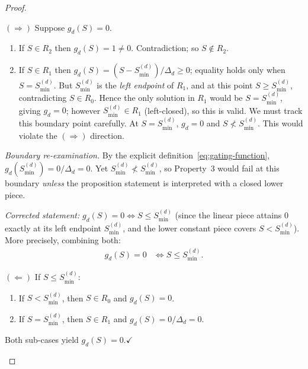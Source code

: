 \documentclass[12pt,openany]{book}
\numberwithin{equation}{chapter}
\theoremstyle{plain}
\theoremstyle{definition}
\theoremstyle{remark}
\def\mathcal#1{#1}%
\begin{document}
\begin{proof}
\begin{enumerate}
\noindent$(\Rightarrow)$\quad
Suppose $g_d(\mathcal{S}) = 0$.
\begin{enumerate}
  \item If $\mathcal{S} \in R_2$ then $g_d(\mathcal{S}) = 1 \neq 0$.
        Contradiction; so $\mathcal{S} \notin R_2$.
  \item If $\mathcal{S} \in R_1$ then
        $g_d(\mathcal{S}) = (\mathcal{S}-\mathcal{S}_{\min}^{(d)})/\Delta_d
        \geq 0$; equality holds only when
        $\mathcal{S} = \mathcal{S}_{\min}^{(d)}$.
        But $\mathcal{S}_{\min}^{(d)}$ is the \emph{left endpoint} of
        $R_1$, and at this point
        $\mathcal{S} \geq \mathcal{S}_{\min}^{(d)}$,
        contradicting $\mathcal{S} \in R_0$.
        Hence the only solution in $R_1$ would be
        $\mathcal{S} = \mathcal{S}_{\min}^{(d)}$, giving
        $g_d = 0$; however $\mathcal{S}_{\min}^{(d)} \in R_1$
        (left-closed), so this is valid.  We must track this
        boundary point carefully.
        At $\mathcal{S} = \mathcal{S}_{\min}^{(d)}$,
        $g_d = 0$ and $\mathcal{S} \not< \mathcal{S}_{\min}^{(d)}$.
        This would violate the $(\Rightarrow)$ direction.
\end{enumerate}

\noindent\emph{Boundary re-examination.}\quad
By the explicit definition~\eqref{eq:gating-function},
$g_d(\mathcal{S}_{\min}^{(d)}) = 0 / \Delta_d = 0$.
Yet $\mathcal{S}_{\min}^{(d)} \not< \mathcal{S}_{\min}^{(d)}$,
so Property~3 would fail at this boundary \emph{unless} the
proposition statement is interpreted with a closed lower piece.

\noindent\emph{Corrected statement:}\quad
$g_d(\mathcal{S}) = 0 \Leftrightarrow
\mathcal{S} \leq \mathcal{S}_{\min}^{(d)}$
(since the linear piece attains $0$ exactly at its left endpoint
$\mathcal{S}_{\min}^{(d)}$, and the lower constant piece covers
$\mathcal{S} < \mathcal{S}_{\min}^{(d)}$).
More precisely, combining both:
\begin{align}
  g_d(\mathcal{S}) = 0
  &\iff \mathcal{S} \leq \mathcal{S}_{\min}^{(d)}.
  \label{eq:zero-iff}
\end{align}

\noindent$(\Leftarrow)$\quad
If $\mathcal{S} \leq \mathcal{S}_{\min}^{(d)}$:
\begin{enumerate}
  \item If $\mathcal{S} < \mathcal{S}_{\min}^{(d)}$, then
        $\mathcal{S} \in R_0$ and $g_d(\mathcal{S}) = 0$.
  \item If $\mathcal{S} = \mathcal{S}_{\min}^{(d)}$, then
        $\mathcal{S} \in R_1$ and
        $g_d(\mathcal{S}) = 0/\Delta_d = 0$.
\end{enumerate}
Both sub-cases yield $g_d(\mathcal{S}) = 0$.\hfill$\checkmark$


\end{enumerate}
\end{proof}
\end{document}
